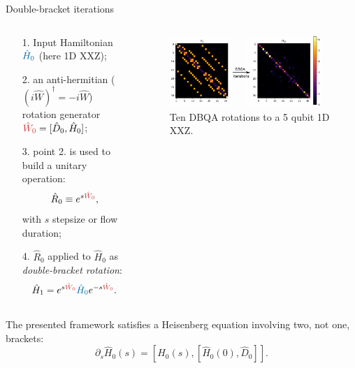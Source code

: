 \documentclass[aspectratio=169, 8pt, xcolor={svgnames}]{beamer}
\begin{document}
\begin{frame}{Double-bracket iterations}
\begin{columns}[T,onlytextwidth]
    \begin{column}{0.45\textwidth}
        \begin{itemize}[noitemsep]
            \item[1.] Input Hamiltonian $\textcolor{mediumpersianblue}{\hat H_0}$ (here 1D XXZ);
            \item[2.] an anti-hermitian ($(i\hat{W})^{\dagger} = -i\hat{W}$) rotation generator $\textcolor{persianred}{\hat{W}_0} = [\hat{D}_0, \hat H_0]$;
            \item[3.] point 2. is used to build a unitary operation:
              $$ \hat{R}_0 \equiv e^{s \textcolor{persianred}{\hat{W}_0}}, $$
              with $s$ stepsize or flow duration;
            \item[4.] $\hat{R}_0$ applied to $\hat{H}_0$ as \textit{double-bracket rotation}:
               $$ \hat H_1 =  e^{s\textcolor{persianred}{\hat{W}_0}} \textcolor{mediumpersianblue}{\hat H_0} e^{- s \textcolor{persianred}{\hat{W}_0}}.$$
        \end{itemize}

    \end{column}

    \begin{column}{0.55\textwidth}
        \begin{figure}
           \includegraphics[width=0.95\textwidth]{figures/dbqa_10steps.pdf}
        \caption{Ten DBQA rotations to a 5 qubit 1D XXZ.}
        \end{figure}
    \end{column}
\end{columns}
\begin{tcolorbox}[colback=red!15, title=Nomenclature reason]
The presented framework satisfies a Heisenberg equation involving two, not one, brackets:
$$ \partial_s \hat{H}_0(s) = [ \hat{H}_0(s), [ \hat{H}_0(0), \hat{D}_0 ] ]. $$
\end{tcolorbox}
\end{frame}
\end{document}
